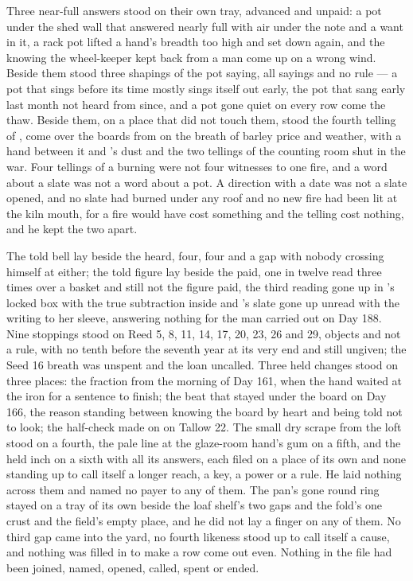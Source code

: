 Three near-full answers stood on their own tray, advanced and unpaid: a pot under the shed wall that answered nearly full with air under the note and a want in it, a rack pot lifted a hand's breadth too high and set down again, and the knowing the wheel-keeper kept back from a man come up on a wrong wind. Beside them stood three shapings of the pot saying, all sayings and no rule --- a pot that sings before its time mostly sings itself out early, the pot that sang early last month not heard from since, and a pot gone quiet on every row come the thaw. Beside them, on a place that did not touch them, stood the fourth telling of , come over the boards from  on the breath of barley price and weather, with a hand between it and 's dust and the two tellings of the counting room shut in the war. Four tellings of a burning were not four witnesses to one fire, and a word about a slate was not a word about a pot. A direction with a date was not a slate opened, and no slate had burned under any roof and no new fire had been lit at the kiln mouth, for a fire would have cost something and the telling cost nothing, and he kept the two apart.

The told bell lay beside the heard, four, four and a gap with nobody crossing himself at either; the told figure lay beside the paid, one in twelve read three times over a basket and still not the figure paid, the third reading gone up  in 's locked box with the true subtraction inside and 's slate gone up unread with the writing to her sleeve, answering nothing for the man carried out on Day 188. Nine stoppings stood on Reed 5, 8, 11, 14, 17, 20, 23, 26 and 29, objects and not a rule, with no tenth before the seventh year at its very end and still ungiven; the Seed 16 breath was unspent and the loan uncalled. Three held changes stood on three places: the fraction from the morning of Day 161, when the hand waited at the iron for a sentence to finish; the beat that stayed under the board on Day 166, the reason standing between knowing the board by heart and being told not to look; the half-check made on  on Tallow 22. The small dry scrape from the loft stood on a fourth, the pale line at the glaze-room hand's gum on a fifth, and the held inch on a sixth with all its answers, each filed on a place of its own and none standing up to call itself a longer reach, a key, a power or a rule. He laid nothing across them and named no payer to any of them. The pan's gone round ring stayed on a tray of its own beside the loaf shelf's two gaps and the fold's one crust and the field's empty place, and he did not lay a finger on any of them. No third gap came into the yard, no fourth likeness stood up to call itself a cause, and nothing was filled in to make a row come out even. Nothing in the file had been joined, named, opened, called, spent or ended.

